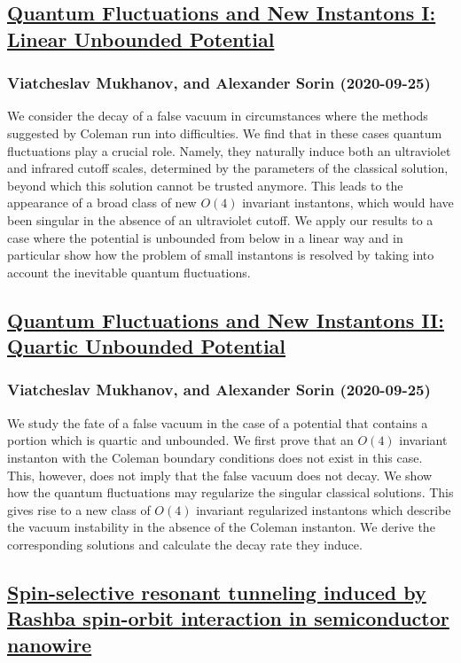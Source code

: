 \subsection*{\href{http://arxiv.org/abs/2009.12445v1}{Quantum Fluctuations and New Instantons I: Linear Unbounded Potential}}
\subsubsection*{Viatcheslav Mukhanov, and Alexander Sorin (2020-09-25)}
We consider the decay of a false vacuum in circumstances where the methods
suggested by Coleman run into difficulties. We find that in these cases quantum
fluctuations play a crucial role. Namely, they naturally induce both an
ultraviolet and infrared cutoff scales, determined by the parameters of the
classical solution, beyond which this solution cannot be trusted anymore. This
leads to the appearance of a broad class of new $O(4)$ invariant instantons,
which would have been singular in the absence of an ultraviolet cutoff. We
apply our results to a case where the potential is unbounded from below in a
linear way and in particular show how the problem of small instantons is
resolved by taking into account the inevitable quantum fluctuations.

\subsection*{\href{http://arxiv.org/abs/2009.12444v1}{Quantum Fluctuations and New Instantons II: Quartic Unbounded Potential}}
\subsubsection*{Viatcheslav Mukhanov, and Alexander Sorin (2020-09-25)}
We study the fate of a false vacuum in the case of a potential that contains
a portion which is quartic and unbounded. We first prove that an $O(4)$
invariant instanton with the Coleman boundary conditions does not exist in this
case. This, however, does not imply that the false vacuum does not decay. We
show how the quantum fluctuations may regularize the singular classical
solutions. This gives rise to a new class of $O(4)$ invariant regularized
instantons which describe the vacuum instability in the absence of the Coleman
instanton. We derive the corresponding solutions and calculate the decay rate
they induce.

\subsection*{\href{http://arxiv.org/abs/2009.12439v1}{Spin-selective resonant tunneling induced by Rashba spin-orbit  interaction in semiconductor nanowire}}
